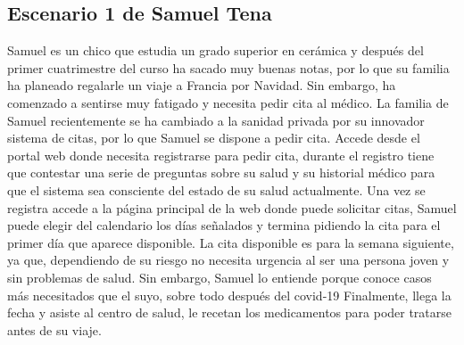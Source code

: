 \subsection{Escenario 1 de Samuel Tena} 
    Samuel es un chico que estudia un grado superior en cerámica y después del primer
    cuatrimestre del curso ha sacado muy buenas notas, por lo que su familia ha planeado
    regalarle un viaje a Francia por Navidad. Sin embargo, ha comenzado a sentirse muy fatigado
     y necesita pedir cita al médico. La familia de Samuel recientemente
    se ha cambiado a la sanidad privada por su innovador sistema de citas, por lo que Samuel se
    dispone a pedir cita. Accede desde el portal web donde necesita registrarse para pedir cita,
    durante el registro tiene que contestar una serie de preguntas sobre su salud y su historial
    médico para que el sistema sea consciente del estado de su salud actualmente. Una vez se registra 
    accede a la página principal de la web donde puede solicitar citas, Samuel puede elegir del calendario
    los días señalados y termina pidiendo la cita para el primer día que aparece disponible. La cita disponible
    es para la semana siguiente, ya que, dependiendo de su riesgo no necesita urgencia al ser una persona joven y sin problemas de salud. 
    Sin embargo, Samuel lo entiende porque conoce casos más necesitados que el suyo, sobre todo después del covid-19
    Finalmente, llega la fecha y asiste al centro de salud, le recetan los medicamentos para poder tratarse antes de su viaje.
    

